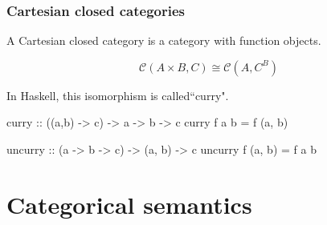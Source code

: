 \documentclass[
xcolor={usenames,dvipsnames,svgnames},
]{beamer}
\begin{document}
  \begin{frame}[fragile]
    \frametitle{Cartesian closed categories}
    A Cartesian closed category is a category with function objects.

    \[
    \mathcal{C}(A \times B, C) \cong \mathcal{C}(A, C^B)
    \]

    In Haskell, this isomorphism is called``curry".

    \begin{code}
      curry :: ((a,b) -> c) -> a -> b -> c
      curry f a b = f (a, b)

      uncurry :: (a -> b -> c) -> (a, b) -> c
      uncurry f (a, b) = f a b
    \end{code}

  \end{frame}


  \section{Categorical semantics}
\end{document}
